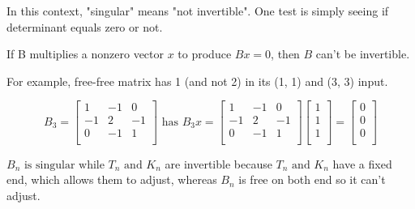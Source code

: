 In this context, "singular" means "not invertible".
One test is simply seeing if determinant equals zero or not.

\begin{theorem}
    If B multiplies a nonzero vector \(x\) to produce \(Bx = 0\), then \(B\) can't be invertible.   
\end{theorem}

For example, free-free matrix has 1 (and not 2) in its (1, 1) and (3, 3) input.

\[
    B_3 =
    \begin{bmatrix}
        1 & -1 & 0  \\
        -1 & 2 & -1  \\
        0 & -1 & 1  \\
    \end{bmatrix}
    \text{ has }
    B_{3}x =
    \begin{bmatrix}
        1 & -1 & 0  \\
        -1 & 2 & -1  \\
        0 & -1 & 1  \\
    \end{bmatrix} 
    \begin{bmatrix}
        1 \\
        1 \\
        1 \\
    \end{bmatrix}
    =
    \begin{bmatrix}
        0  \\
        0  \\
        0  \\
    \end{bmatrix}
\]

\(B_n \text{ is singular while } T_n \text{ and } K_n\) are invertible because \(T_n \text{ and } K_n\) have a fixed end, which allows them to adjust, whereas \(B_n\) is free on both end so it can't adjust. 

